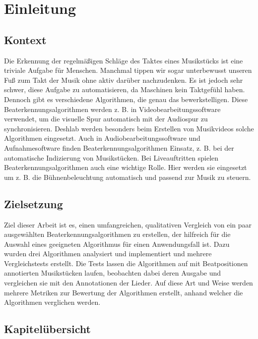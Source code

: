\chapter{Einleitung}
\label{einleitung}

\section{Kontext}
{
	Die Erkennung der regelmäßigen Schläge des Taktes eines Musikstücks ist eine triviale Aufgabe für Menschen.
	Manchmal tippen wir sogar unterbewusst unseren Fuß zum Takt der Musik ohne aktiv darüber nachzudenken.
	Es ist jedoch sehr schwer,
		diese Aufgabe zu automatisieren,
		da Maschinen kein Taktgefühl haben.
	Dennoch gibt es verschiedene Algorithmen,
		die genau das bewerkstelligen.
	Diese Beaterkennungsalgorithmen werden z. B. in Videobearbeitungssoftware verwendet,
		um die visuelle Spur automatisch mit der Audiospur zu synchronisieren.
	Deshlab werden besonders beim Erstellen von Musikvideos solche Algorithmen eingesetzt.
	Auch in Audiobearbeitungssoftware und Aufnahmesoftware finden Beaterkennungsalgorithmen Einsatz,
		z. B. bei der automatische Indizierung von Musikstücken.
	Bei Liveauftritten spielen Beaterkennungsalgorithmen auch eine wichtige Rolle.
	Hier werden sie eingesetzt um z. B. die Bühnenbeleuchtung automatisch und passend zur Musik zu steuern.
}

\section{Zielsetzung}
{
	Ziel dieser Arbeit ist es,
		einen umfangreichen, qualitativen Vergleich von ein paar ausgewählten Beaterkennungsalgorithmen zu erstellen,
		der hilfreich für die Auswahl eines geeigneten Algorithmus für einen Anwendungsfall ist.
	Dazu wurden drei Algorithmen analysiert und implementiert
		und mehrere Vergleichstests erstellt.
	Die Tests lassen die Algorithmen auf mit Beatpositionen annotierten Musikstücken laufen,
		beobachten dabei deren Ausgabe
		und vergleichen sie mit den Annotationen der Lieder.
	Auf diese Art und Weise werden mehrere Metriken zur Bewertung der Algorithmen erstellt,
		anhand welcher die Algorithmen verglichen werden.
}

\section{Kapitelübersicht}
{
}

